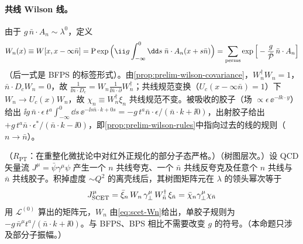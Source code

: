 \paragraph{共线 Wilson 线。}
由于 $g\,\bar n\cdot A_n\sim\lambda^0$，定义
\begin{equation}\label{eq:scet-Wn}
W_n(x)\equiv W[x,x-\infty\bar n]=\mathrm P\exp\Big(\ii g\int_{-\infty}^0\dd s\;\bar n\cdot A_n(x+s\bar n)\Big)
=\sum_{\rm perms}\exp\Big[-\frac{g}{\bar{\mathcal P}}\,\bar n\cdot A_n\Big]
\end{equation}
（后一式是 BFPS 的标签形式\cite{BauerEtAl2001}）。由\cref{prop:prelim-wilson-covariance}，$W_n^\dagger W_n=1$，$\bar n\cdot D_cW_n=0$，故 $\frac{1}{\ii\bar n\cdot D_c}=W_n\frac{1}{\ii\bar n\cdot\partial}W_n^\dagger$；共线规范变换（$U_c(x-\infty\bar n)=1$）下 $W_n\to U_c(x)W_n$，故 $\chi_n\equiv W_n^\dagger\xi_n$ 共线规范不变。被吸收的胶子（场 $\propto\epsilon\,\ee^{-\ii k\cdot y}$）给出 $\ii g\,\bar n\cdot\epsilon\,t^a\int_{-\infty}^0\dd s\,\ee^{-\ii s\bar n\cdot k+0s}=-g\,t^a\bar n\cdot\epsilon/(\bar n\cdot k+\ii0)$，出射胶子给出 $+g\,t^a\bar n\cdot\epsilon^*/(\bar n\cdot k-\ii0)$，即\cref{prop:prelim-wilson-rules}中指向过去的线的规则（$n\to\bar n$）。

\begin{proposition}\label{prop:scet-wilson}
（$R_{\mathrm{PT}}$：在重整化微扰论中对红外正规化的部分子态严格。）（树图层次。）设 QCD 矢量流 $J^\mu=\bar\psi\gamma^\mu\psi$ 产生一个 $n$ 共线夸克、一个 $\bar n$ 共线反夸克及任意个 $n$ 共线与 $\bar n$ 共线胶子。积掉虚度 $\sim Q^2$ 的离壳线后，其树图矩阵元在 $\lambda$ 的领头幂次等于
\begin{equation}\label{eq:scet-Jtree}
J^\mu_{\rm SCET}=\bar\xi_n\,W_n\,\gamma_\perp^\mu\,W_{\bar n}^\dagger\,\xi_{\bar n}=\bar\chi_n\gamma_\perp^\mu\chi_{\bar n}
\end{equation}
用 $\mathcal L^{(0)}$ 算出的矩阵元，$W_n$ 由\cref{eq:scet-Wn}给出，单胶子规则为 $-g\,\bar n^\mu t^a/(\bar n\cdot k+\ii0)$。与 BFPS、BPS 相比不需要改变 $g$ 的符号。（本命题只涉及部分子振幅。）
\end{proposition}

